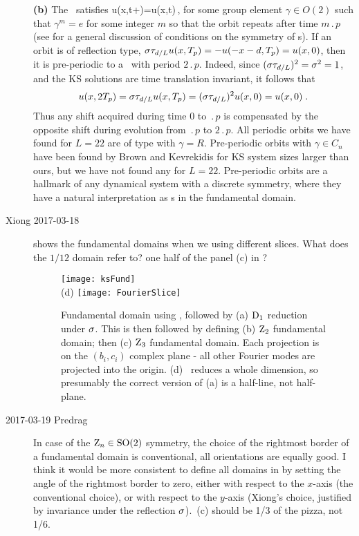 \begin{description}
{\bf (b)} The \po\ satisfies
\beq
	 u(x,t+)=\gamma u(x,t)\,,
	\label{eq:POspattemp}
\eeq
for some group element $\gamma\in O(2)$ such that
$\gamma^m=e$ for some integer $m$ so that the orbit repeats
after time $m \period{p}$ (see
 for a general discussion of
conditions on the symmetry of \po s).
If an orbit is of reflection type, %
$\sigma\tau_{d/L} u(x,{T_{p}}) =
-u(-x-d,{T_{p}}) = u(x,0)$, then it is pre-periodic
to a \po\ with period $2\period{p}$. Indeed, since
$(\sigma\tau_{d/L})^2 = \sigma^2 = 1$, and the KS
solutions are time translation invariant, it follows %
that
\[
  u(x,2{T_{p}}) = \sigma\tau_{d/L} u(x,{T_{p}}) =
  (\sigma\tau_{d/L})^2 u(x,0) = u(x,0)\;.
\]
Thus any shift acquired during time $0$ to
$\period{p}$ is compensated by the opposite shift during
evolution from $\period{p}$ to $2 \period{p}$.
All periodic orbits we have found for $L=22$ are of type
 with $\gamma=R$. Pre-periodic orbits
with $\gamma\in C_n$ have been found by Brown and
Kevrekidis for KS system sizes larger than ours,
but we have not found any for $L=22$.
Pre-periodic orbits are a hallmark of any dynamical system
with a discrete symmetry, where they have a natural
interpretation as \po s in the fundamental
domain.

\item[Xiong 2017-03-18]
shows the fundamental domains when we using different slices.
What does the $1/12$ domain refer to? one half of the panel (c)
in ?
\begin{figure}[h]
  \centering
  \texttt{[image: ksFund]}
  \\
  (d) \texttt{[image: FourierSlice]}
  \caption{
    Fundamental domain using {\fFslice}, followed by (a) $\textrm{D}_{1}$
    reduction under $\sigma$. This is then followed by defining (b)
    $\textrm{Z}_{2}$ fundamental domain; then (c) $\textrm{Z}_{3}$ fundamental domain.
    Each projection is on the $(b_i,c_i)$ complex plane - all
    other Fourier modes are projected into the origin.
    (d) \FFslice\ reduces a whole dimension, so presumably the correct
    version of (a) is a half-line, not half-plane.
  }
  \label{fig:ksFund}
\end{figure}
\item[2017-03-19 Predrag]
In case of the $\textrm{Z}_{n} \in \textrm{SO}(2)$ symmetry, the choice of the rightmost
border of a fundamental domain is conventional, all orientations are
equally good. I think it would be more consistent to define all domains
in  by setting the angle of the rightmost border to
zero, either with respect to the $x$-axis (the conventional choice), or
with respect to the $y$-axis
(Xiong's choice, justified by invariance under the reflection $\sigma$).
\,(c) should be 1/3 of the pizza, not 1/6.


\end{description}
